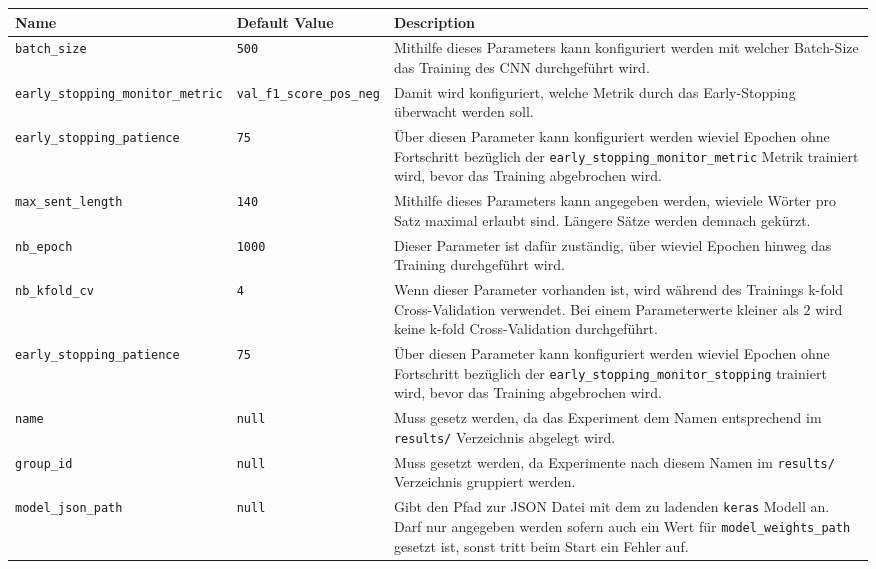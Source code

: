 \begin{table}[H]
	\centering
	\begin{adjustbox}{max width=\textwidth, max height=\textheight}
		\begin{tabular}{llp{10cm}}
			\toprule
			Name & Default Value & Description\\ \midrule
			\texttt{batch{\_}size} & \texttt{500} & Mithilfe dieses Parameters kann konfiguriert werden mit welcher Batch-Size das Training des CNN durchgeführt wird.\\
			\texttt{early{\_}stopping{\_}monitor{\_}metric} & \texttt{val{\_}f1{\_}score{\_}pos{\_}neg} & Damit wird konfiguriert, welche Metrik durch das Early-Stopping überwacht werden soll.\\
			\texttt{early{\_}stopping{\_}patience} & \texttt{75} & Über diesen Parameter kann konfiguriert werden wieviel Epochen ohne Fortschritt bezüglich der \texttt{early{\_}stopping{\_}monitor{\_}metric} Metrik trainiert wird, bevor das Training abgebrochen wird.\\
			\texttt{max{\_}sent{\_}length} & \texttt{140} & Mithilfe dieses Parameters kann angegeben werden, wieviele Wörter pro Satz maximal erlaubt sind. Längere Sätze werden demnach gekürzt.\\
			\texttt{nb{\_}epoch} & \texttt{1000} & Dieser Parameter ist dafür zuständig, über wieviel Epochen hinweg das Training durchgeführt wird.\\
			\texttt{nb{\_}kfold{\_}cv} & \texttt{4} & Wenn dieser Parameter vorhanden ist, wird während des Trainings k-fold Cross-Validation verwendet. Bei einem Parameterwerte kleiner als $2$ wird keine k-fold Cross-Validation durchgeführt.\\
			\texttt{early{\_}stopping{\_}patience} & \texttt{75} & Über diesen Parameter kann konfiguriert werden wieviel Epochen ohne Fortschritt bezüglich der \texttt{early{\_}stopping{\_}monitor{\_}stopping} trainiert wird, bevor das Training abgebrochen wird.\\
			\texttt{name} & \texttt{null} & Muss gesetz werden, da das Experiment dem Namen entsprechend im \texttt{results/} Verzeichnis abgelegt wird.\\
			\texttt{group{\_}id} & \texttt{null} & Muss gesetzt werden, da Experimente nach diesem Namen im \texttt{results/} Verzeichnis gruppiert werden.\\
			\texttt{model{\_}json{\_}path} & \texttt{null} & Gibt den Pfad zur JSON Datei mit dem zu ladenden \texttt{keras} Modell an. Darf nur angegeben werden sofern auch ein Wert für \texttt{model{\_}weights{\_}path} gesetzt ist, sonst tritt beim Start ein Fehler auf.\\

\end{tabular}
\end{adjustbox}
\end{table}
